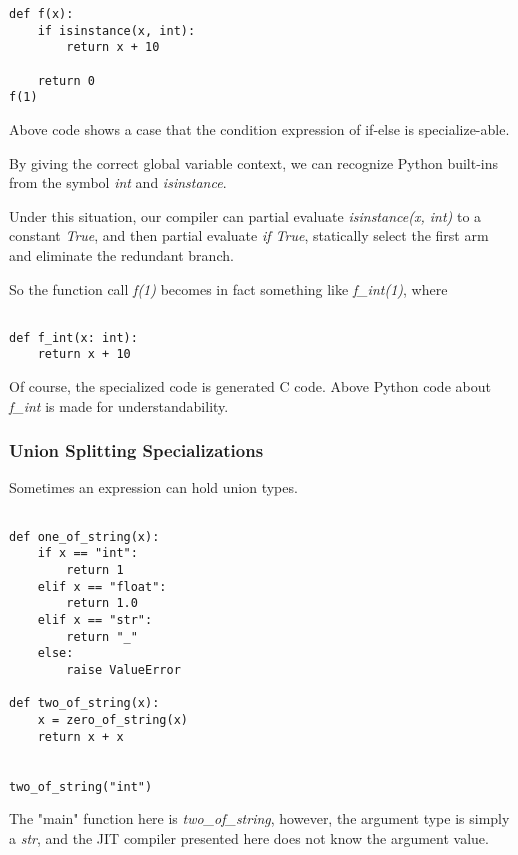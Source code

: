 \documentclass[12pt, a4paper]{report}
\begin{document}
\begin{lstlisting}
def f(x):
    if isinstance(x, int):
        return x + 10

    return 0
f(1)

\end{lstlisting}

Above code shows a case that the condition expression of if-else is specialize-able.

By giving the correct global variable context, we can recognize Python built-ins from the symbol \textit{int} and \textit{isinstance}.

Under this situation, our compiler can partial evaluate \textit{isinstance(x, int)} to a constant \textit{True}, and then
partial evaluate \textit{if True}, statically select the first arm and eliminate the redundant branch.

So the function call \textit{f(1)} becomes in fact something like \textit{f\_int(1)}, where

\begin{lstlisting}

def f_int(x: int):
    return x + 10

\end{lstlisting}

Of course, the specialized code is generated C code. Above Python code about \textit{f\_int} is made for understandability.

\subsubsection*{Union Splitting Specializations}

Sometimes an expression can hold union types.

\begin{lstlisting}
    
def one_of_string(x):
    if x == "int":
        return 1
    elif x == "float":
        return 1.0
    elif x == "str":
        return "_"
    else:
        raise ValueError

def two_of_string(x):
    x = zero_of_string(x)
    return x + x


two_of_string("int")

\end{lstlisting}

The "main" function here is \textit{two\_of\_string}, however, the argument type is simply a \textit{str},
and the JIT compiler presented here does not know the argument value.
\end{document}
